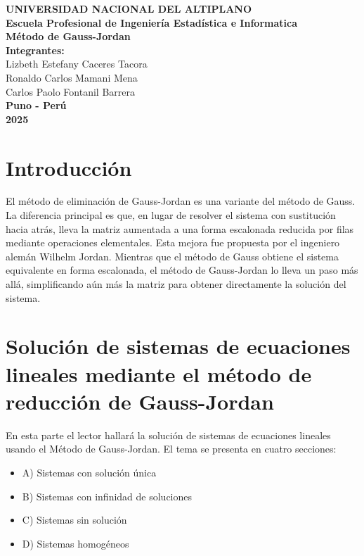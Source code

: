 \documentclass[a4paper,10pt]{article}
\begin{document}
\begin{titlepage}
    \centering
    \vspace*{4cm}

    {\LARGE \textbf{UNIVERSIDAD NACIONAL DEL ALTIPLANO}}\\[0.5cm]
    {\Large \textbf{Escuela Profesional de Ingeniería Estadística e Informatica}}\\[3cm]

    {\huge \textbf{Método de Gauss-Jordan}}\\[2cm]

    \textbf{Integrantes:}\\
    Lizbeth Estefany Caceres Tacora\\
    Ronaldo Carlos Mamani Mena\\
    Carlos Paolo Fontanil Barrera\\[2cm]

    \textbf{Puno - Perú}\\
    \textbf{2025}
\end{titlepage}
\section{Introducción}
El método de eliminación de Gauss-Jordan es una variante del método de Gauss. La diferencia principal es que, en lugar de resolver el sistema con sustitución hacia atrás, lleva la matriz aumentada a una forma escalonada reducida por filas mediante operaciones elementales. Esta mejora fue propuesta por el ingeniero alemán Wilhelm Jordan. Mientras que el método de Gauss obtiene el sistema equivalente en forma escalonada, el método de Gauss-Jordan lo lleva un paso más allá, simplificando aún más la matriz para obtener directamente la solución del sistema.

\section{Solución de sistemas de ecuaciones lineales mediante el método de reducción de Gauss-Jordan}
En esta parte el lector hallará la solución de sistemas de ecuaciones lineales usando el Método de Gauss-Jordan. El tema se presenta en cuatro secciones: 
\begin{itemize}
    \item A) Sistemas con solución única
    \item B) Sistemas con infinidad de soluciones
    \item C) Sistemas sin solución
    \item D) Sistemas homogéneos
\end{itemize}
\end{document}
